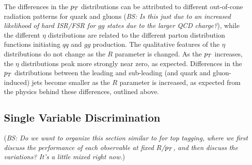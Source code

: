 The differences in the $p_T$ distributions can be attributed to different out-of-cone radiation
patterns for quark and gluons (\emph{BS: Is this just due to an increased likelihood of hard ISR/FSR for $gg$ states due to the larger QCD charge?}), while the different $\eta$ distributions are related to the different
parton distribution functions initiating $qq$ and $gg$ production. The qualitative features of the 
$\eta$ distributions do not change as the $R$ parameter is changed. As the $p_T$ increases, 
the $\eta$ distributions peak more strongly near zero, as expected. Differences in the $p_T$ distributions 
between the leading and sub-leading (and quark and gluon-induced) jets become smaller as the 
$R$ parameter is increased, as expected from the physics behind these differences, outlined above. 

\subsection{Single Variable Discrimination}

(\emph{BS: Do we want to organize this section similar to for top tagging, where we first discuss the performance of each observable at fixed $R$/$p_T$, and then discuss the variations? It's a little mixed right now.})

